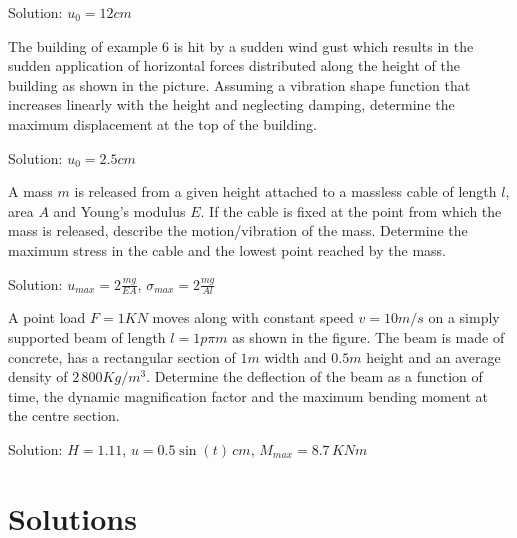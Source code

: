 \documentclass{problems}
\begin{document}
\begin{center}
\end{center}

Solution: $u_0 = 12cm$



 The building of example 6 is hit by a sudden wind gust which results in the sudden application of horizontal forces distributed along the height of the building as shown in the picture. Assuming a vibration shape function that increases linearly with the height and neglecting damping, determine the maximum displacement at the top of the building.

\begin{center}
\end{center}

Solution: $u_0 = 2.5cm$



 A mass $m$ is released from a given height attached to a massless cable of length $l$, area $A$ and Young's modulus $E$. If the cable is fixed at the point from which the mass is released, describe the motion/vibration of the mass. Determine the maximum stress in the cable and the lowest point reached by the mass.

\begin{center}
\end{center}

Solution: $u_{max} = 2\frac{mg}{EA}$, $\sigma_{max} = 2\frac{mg}{Al}$



 A point load $F=1KN$ moves along with constant speed $v=10m/s$ on a simply supported beam of length $l=1p\pi m$ as shown in the figure. The beam is made of concrete, has a rectangular section of $1m$ width and $0.5m$ height and an average density of $2\,800Kg/m^3$. Determine the deflection of the beam as a function of time, the dynamic magnification factor and the maximum bending moment at the centre section.

Solution: $H=1.11$, $u=0.5\sin(t)\,cm$, $M_{max} = 8.7\,KNm$




\newpage
\section{Solutions}
\end{document}
